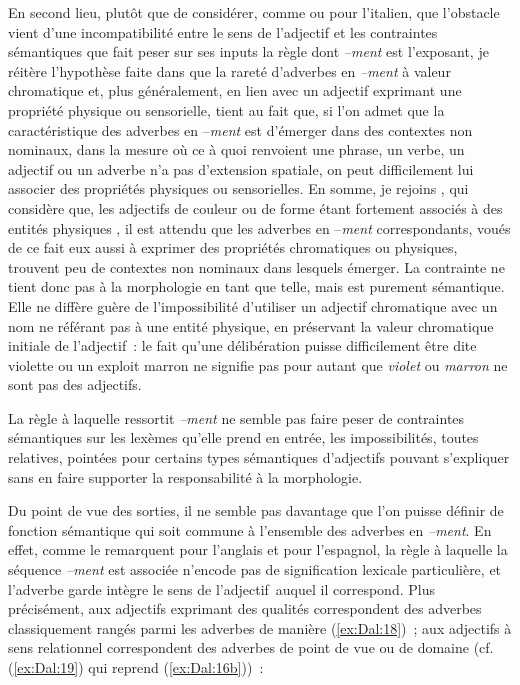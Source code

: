 \documentclass[output=paper]{langsci/langscibook}
\begin{document}
En second lieu, plutôt que de considérer, comme %
\citet{Scalise90} %
%
ou %
\citet{Ricca15} %
%
pour l'italien, que l'obstacle vient d'une incompatibilité entre le sens de l'adjectif et les con\-train\-tes sémantiques que fait peser sur ses inputs la règle dont \emph{--ment} est l'exposant, je réitère l'hypothèse faite dans %
\citet{Dal07} %
%
que la rareté d'adverbes en \emph{--ment} à valeur chromatique et, plus généralement, en lien avec un adjectif exprimant une propriété physique ou sensorielle, tient au fait que, si l'on admet que la caractéristique des adverbes en --\emph{ment} est d'émerger dans des contextes non nominaux, dans la mesure où ce à quoi renvoient une phrase, un verbe, un adjectif ou un adverbe n'a pas d'extension spatiale, on peut difficilement lui associer des propriétés physiques ou sensorielles. En somme, je rejoins %
\citet{Fabregas07}%
%
, qui considère que, les adjectifs de couleur ou de forme étant fortement associés à des entités physiques %
\citep{Quine60}%
%
, il est attendu que les adverbes en --\emph{ment} correspondants, voués de ce fait eux aussi à exprimer des propriétés chromatiques ou physiques, trouvent peu de contextes non nominaux dans lesquels émerger. La contrainte ne tient donc pas à la morphologie en tant que telle, mais est purement sémantique. Elle ne diffère guère de l'impossibilité d'utiliser un adjectif chromatique avec un nom ne référant pas à une entité physique, en préservant la valeur chromatique initiale de l'adjectif~: le fait qu'une délibération puisse difficilement être dite violette ou un exploit marron ne signifie pas pour autant que \emph{violet} ou \emph{marron} ne sont pas des adjectifs.

La règle à laquelle ressortit \emph{--ment} ne semble  pas faire peser de contraintes sémantiques sur les lexèmes qu'elle prend en entrée, les impossibilités, toutes relatives, pointées pour certains types sémantiques d'adjectifs pouvant s'expliquer sans en faire supporter la responsabilité à la morphologie.


Du point de vue des sorties, il ne semble pas davantage que l'on puisse définir de fonction sémantique qui soit commune à l'ensemble des adverbes en \emph{--ment}. En effet, comme le remarquent %
\citet[196]{Plag.2003g} %
%
pour l'anglais et %
\citet[6]{Fabregas07} %
%
pour l'espagnol, la règle à laquelle la séquence \emph{--ment} est associée n'encode pas de signification lexicale particulière, et l'adverbe garde intègre le sens de l'adjectif~auquel il correspond. Plus précisément, aux adjectifs exprimant des qualités correspondent des adverbes classiquement rangés parmi les adverbes de manière (\ref{ex:Dal:18})~; aux adjectifs à sens relationnel correspondent des adverbes de point de vue ou de domaine (cf. (\ref{ex:Dal:19}) qui reprend (\ref{ex:Dal:16b}))~:
\end{document}
